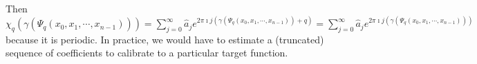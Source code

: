 Then $\chi_q\left(\gamma\left(\Psi_q\left(x_0, x_1, \cdots, x_{n - 1}\right)\right)\right) = \sum\limits_{j = 0}^\infty \widehat{a}_j e^{2\pi \imath j \left(\gamma\left(\Psi_q\left(x_0, x_1, \cdots, x_{n - 1}\right)\right) + q\right)} = \sum\limits_{j = 0}^\infty \widehat{a}_j e^{2\pi \imath j \left(\gamma\left(\Psi_q\left(x_0, x_1, \cdots, x_{n - 1}\right)\right)\right)}$ because it is periodic. In practice, we would have to estimate a (truncated) sequence of coefficients to calibrate to a particular target function.


\nocite{*}  %


